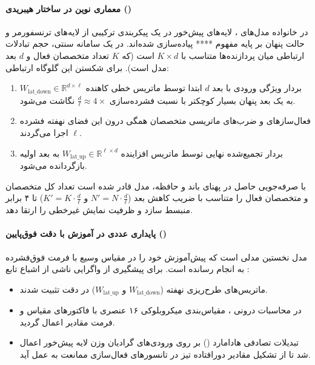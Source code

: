 \item {}

\paragraph*{معماری نوین  در ساختار هیبریدی ()}
در خانواده مدل‌های  \cite{nemotron2025v3}، لایه‌های پیش‌خور در یک پیکربندی ترکیبی از لایه‌های ترنسفورمر و حالت پنهان  بر پایه مفهوم **** پیاده‌سازی شده‌اند. در یک سامانه  سنتی، حجم تبادلات ارتباطی  میان پردازنده‌ها متناسب با $K \times d$ است (که $K$ تعداد متخصصان فعال و $d$ بعد مدل است). برای شکستن این گلوگاه ارتباطی:
\begin{enumerate}
    \item بردار ویژگی ورودی با بعد $d$ ابتدا توسط ماتریس خطی کاهنده $W_{\text{lat\_down}} \in \mathbb{R}^{d \times \ell}$ به یک بعد پنهان بسیار کوچکتر با نسبت فشرده‌سازی $\frac{d}{\ell} \approx 4\times$ نگاشت می‌شود.
    \item فعال‌سازهای  و ضرب‌های ماتریسی متخصصان همگی درون این فضای نهفته فشرده $\ell$ اجرا می‌گردند.
    \item بردار تجمیع‌شده نهایی توسط ماتریس افزاینده $W_{\text{lat\_up}} \in \mathbb{R}^{\ell \times d}$ به بعد اولیه بازگردانده می‌شود.
\end{enumerate}
با صرفه‌جویی حاصل در پهنای باند و حافظه، مدل قادر شده است تعداد کل متخصصان و متخصصان فعال را متناسب با ضریب کاهش بعد ($N' = N \cdot \frac{d}{\ell}$ و $K' = K \cdot \frac{d}{\ell}$) تا ۴ برابر منبسط سازد و ظرفیت نمایش غیرخطی را ارتقا دهد.

\paragraph*{پایداری عددی در آموزش با دقت فوق‌پایین ()}
مدل  نخستین مدلی است که پیش‌آموزش خود را در مقیاس وسیع با فرمت فوق‌فشرده  به انجام رسانده است. برای پیشگیری از واگرایی ناشی از اشباع تابع :
\begin{itemize}
    \item ماتریس‌های طرح‌ریزی نهفته ($W_{\text{lat\_down}}$ و $W_{\text{lat\_up}}$) در دقت  تثبیت شدند.
    \item در محاسبات درونی ، مقیاس‌بندی میکروبلوکی ۱۶ عنصری با فاکتورهای مقیاس  و فرمت مقادیر  اعمال گردید.
    \item تبدیلات تصادفی هادامارد () بر روی ورودی‌های گرادیان وزن لایه پیش‌خور اعمال شد تا از تشکیل مقادیر دورافتاده تیز در تانسورهای فعال‌سازی ممانعت به عمل آید.
\end{itemize}

